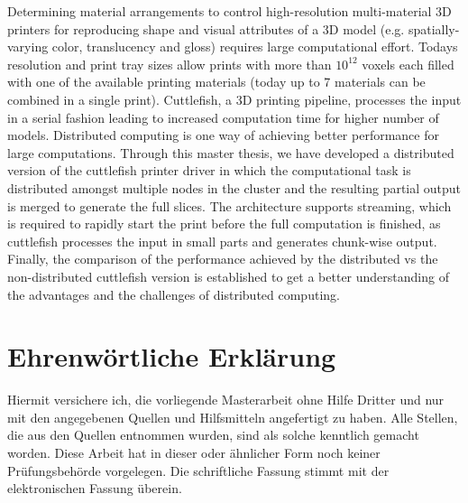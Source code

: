 \documentclass[type=msc,colorback,accentcolor=tud1d,bigchapter]{tudthesis}
\begin{document}
    {}
  \author{Suman Bidarahalli}
	\dateofexam{\today}{\today}
  \makethesistitle

\abstract
Determining material arrangements to control high-resolution multi-material 3D printers for reproducing shape and visual attributes of a 3D model (e.g. spatially-varying color, translucency and gloss) requires large computational effort. Today\textquotesingle s resolution and print tray sizes allow prints with more than \begin{math}10^{12}  \end{math} voxels each filled with one of the available printing materials (today up to 7 materials can be combined in a single print). Cuttlefish, a 3D printing pipeline, processes the input in a serial fashion leading to increased computation time for higher number of models. Distributed computing is one way of achieving better performance for large computations. Through this master thesis, we have developed a distributed version of the cuttlefish printer driver in which the computational task is distributed amongst multiple nodes in the cluster and the resulting partial output is merged to generate the full slices. The architecture supports streaming, which is required to rapidly start the print before the full computation is finished, as cuttlefish processes the input in small parts and generates chunk-wise output. Finally, the comparison of the performance achieved by the distributed vs the non-distributed cuttlefish version is established to get a better understanding of the advantages and the challenges of distributed computing.\newpage

\chapter*{Ehrenw\"ortliche Erkl\"arung}
Hiermit versichere ich, die vorliegende Masterarbeit ohne Hilfe Dritter und nur mit den angegebenen Quellen
und Hilfsmitteln angefertigt zu haben. Alle Stellen, die aus den Quellen entnommen wurden, sind als solche
kenntlich gemacht worden. Diese Arbeit hat in dieser oder \"ahnlicher Form noch keiner Pr\"ufungsbeh\"orde vorgelegen.
Die schriftliche Fassung stimmt mit der elektronischen Fassung \"uberein.

\vspace{1.5cm}
	
\end{document}
